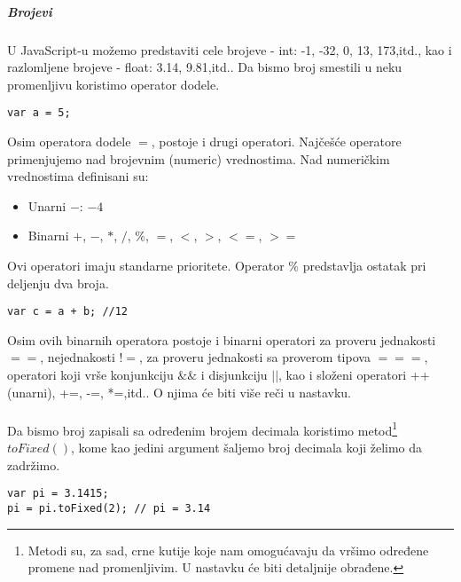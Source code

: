 \subparagraph{Brojevi}
U JavaScript-u možemo predstaviti cele brojeve - int: -1, -32, 0, 13, 173,itd., kao i razlomljene brojeve - float: 3.14, 9.81,itd..
Da bismo broj smestili u neku promenljivu koristimo operator dodele.
\begin{lstlisting}[backgroundcolor = \color{lightgray}, breaklines=true]
var a = 5; 
\end{lstlisting}
Osim operatora dodele $=$, postoje i drugi operatori. Najčešće operatore primenjujemo nad brojevnim (numeric) vrednostima. Nad numeričkim vrednostima definisani su:
\begin{itemize}
    \item Unarni $-$: $-4$
    \item Binarni $+$, $-$, $*$, $/$, $\%$, $=$, $<$, $>$, $<=$, $>=$
\end{itemize}
Ovi operatori imaju standarne prioritete. Operator $\%$ predstavlja ostatak pri deljenju dva broja.\\
\begin{lstlisting}[backgroundcolor = \color{lightgray}, breaklines=true]
var c = a + b; //12
\end{lstlisting}
Osim ovih binarnih operatora postoje i binarni operatori za proveru jednakosti $==$, nejednakosti $!=$, za proveru jednakosti sa proverom tipova $===$, operatori koji vrše konjunkciju $\&\&$ i disjunkciju $||$, kao i složeni operatori ++(unarni), +=, -=, *=,itd.. O njima će biti više reči u nastavku. \\\\
Da bismo broj zapisali sa određenim brojem decimala koristimo metod\footnote{Metodi su, za sad, crne kutije koje nam omogućavaju da vršimo određene promene nad promenljivim. U nastavku će biti detaljnije obrađene.} $toFixed()$, kome kao jedini argument šaljemo broj decimala koji želimo da zadržimo. 
\begin{lstlisting}[backgroundcolor = \color{lightgray}, breaklines=true]
var pi = 3.1415;
pi = pi.toFixed(2); // pi = 3.14
\end{lstlisting}
